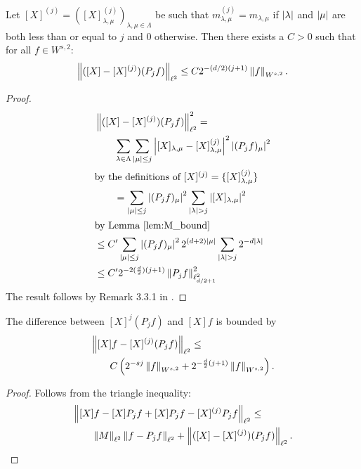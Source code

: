 \begin{lemma} 
	Let $[X]^{(j)}=([X]^{(j)}_{\lambda,\mu})_{\lambda,\mu \in \Lambda}$ be such that $m^{(j)}_{\lambda,\mu} = m_{\lambda,\mu}$ if ${\lvert\lambda\rvert}$ and ${\lvert\mu\rvert}$ are both less than or equal to $j$ and $0$ otherwise. Then there exists a $C > 0$ such that for all $f \in W^{s,2}$:
	\begin{equation}
		\left\| ( [X]- [X]^{(j)})(P_j f) \right\|_{\ell^2} \leq C2^{-(d/2)(j+1)} \left\| f \right\|_{W^{s,2}}.
	\end{equation}
\end{lemma}
\begin{proof}
	\begin{align*}
		&\left\| ([X]-[X]^{(j)})(P_j f) \right\|_{\ell^2}^2 = \\
		&\qquad \sum_{\lambda \in \Lambda} \sum_{{\lvert\mu\rvert}\leq j} \left| [X]_{\lambda,\mu}-[X]^{(j)}_{\lambda,\mu} \right|^2 \left| (P_j f)_\mu \right|^2 \\
	\intertext{by the definitions of $[X]^{(j)} = \{ [X]_{\lambda,\mu}^{(j)} \}$ }
		&\qquad = \sum_{{\lvert\mu\rvert}\leq j}\left| (P_j f)_\mu \right|^2 \sum_{{\lvert\lambda\rvert}>j}\left| [X]_{\lambda,\mu} \right|^2 \\
	\intertext{by Lemma \ref{lem:M_bound}}
		 &\leq C'\sum_{{\lvert\mu\rvert}\leq j}\left| (P_j f)_\mu \right|^2 2^{(d+2){\lvert\mu\rvert}}\sum_{{\lvert\lambda\rvert}>j}2^{-d{\lvert\lambda\rvert}} \\
		 &\leq C' 2^{-2(\frac{d}{2})(j+1)}\left\| P_j f \right\|^2_{\ell^2_{d/2+1}}
	\end{align*}
	The result follows by Remark 3.3.1 in \cite{Cohen2003}.
\end{proof}

\begin{corollary}
	The difference between $[X]^j (P_j f)$ and $[X] f$ is bounded by
	\begin{align*}
		&\left\| [X]f - [X]^{(j)}(P_j f) \right\|_{\ell^2} \leq \\
		&	\qquad  C \left( 2^{-sj}\left\| f \right\|_{W^{s,2}} + 2^{-\frac{d}{2}(j+1)}\left\| f \right\|_{W^{s,2}} \right).
	\end{align*}
\end{corollary}
\begin{proof}
	Follows from the triangle inequality:
	\begin{align*}
		&\left\| [X]f - [X] P_j f + [X] P_j f - [X]^{(j)} P_j f \right\|_{\ell^2} \leq \\
		&\qquad \left\| M \right\|_{\ell^2} \left\| f - P_j f \right\|_{\ell^2} + \left\| ([X]-[X]^{(j)})(P_j f) \right\|_{\ell^2}.
	\end{align*}
\end{proof}

